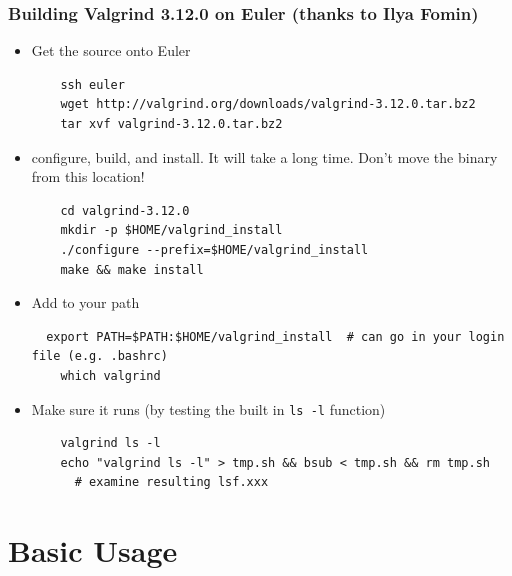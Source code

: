 \documentclass{beamer}
\begin{document}
\begin{frame}[fragile]
  \frametitle{Building Valgrind 3.12.0 on Euler (thanks to Ilya Fomin)}
  \begin{itemize}
    \item Get the source onto Euler
      \begin{lstlisting}
    ssh euler
    wget http://valgrind.org/downloads/valgrind-3.12.0.tar.bz2
    tar xvf valgrind-3.12.0.tar.bz2
      \end{lstlisting}
\item configure, build, and install. It will take a long time.
  Don't move the binary from this location!
  \begin{lstlisting}
    cd valgrind-3.12.0
    mkdir -p $HOME/valgrind_install
    ./configure --prefix=$HOME/valgrind_install
    make && make install
  \end{lstlisting}
\item Add to your path
  \begin{lstlisting}
  export PATH=$PATH:$HOME/valgrind_install  # can go in your login file (e.g. .bashrc)
    which valgrind
  \end{lstlisting}
\item Make sure it runs (by testing the built in \texttt{ls -l} function)
  \begin{lstlisting}
    valgrind ls -l
    echo "valgrind ls -l" > tmp.sh && bsub < tmp.sh && rm tmp.sh  
      # examine resulting lsf.xxx 
  \end{lstlisting}
  \end{itemize}
\end{frame}

\section{Basic Usage}
\end{document}
